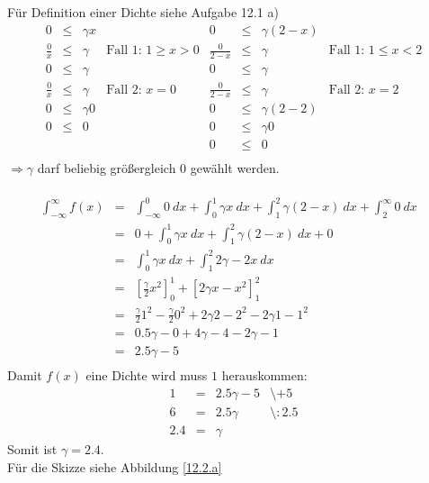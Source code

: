 \documentclass[twoside]{article}
\begin{document}
\sss
Für Definition einer Dichte siehe Aufgabe 12.1 a)
\[
    \begin{array}{rll|l||rll|l}
    0&\leq&\gamma x&&0&\leq&\gamma(2-x)&\\
    \frac{0}{x}&\leq&\gamma&\text{Fall 1: }1\geq x>0&\frac{0}{2-x}&\leq&\gamma&\text{Fall 1: }1\leq x<2\\
    0&\leq&\gamma&&0&\leq&\gamma&\\
    \frac{0}{x}&\leq&\gamma&\text{Fall 2: }x=0&\frac{0}{2-x}&\leq&\gamma&\text{Fall 2: }x=2\\
    0&\leq&\gamma 0&&0&\leq&\gamma(2-2)&\\
    0&\leq&0&&0&\leq&\gamma0&\\
    &&&&0&\leq&0&\\
    \end{array}
\]
$\Rightarrow \gamma$ darf beliebig größergleich $0$ gewählt werden.\\
\\
\[
    \begin{array}{rlll}
        \int_{-\infty}^{\infty}f(x)&=&\int_{-\infty}^{0}0~dx+\int_{0}^{1}\gamma x~dx+\int_{1}^{2}\gamma(2-x)~dx+\int_{2}^{\infty}0~dx&\\
        &=&0+\int_{0}^{1}\gamma x~dx+\int_{1}^{2}\gamma(2-x)~dx+0&\\
        &=&\int_{0}^{1}\gamma x~dx+\int_{1}^{2}2\gamma-2x~dx&\\
        &=&\left[\frac{\gamma}{2} x^2\right]_0^1+\left[2\gamma x -x^2\right]_{1}^{2}&\\
        &=&\frac{\gamma}{2}1^2-\frac{\gamma}{2}0^2+2\gamma 2 -2^2-2\gamma 1 -1^2&\\
        &=&0.5\gamma-0+4\gamma-4-2\gamma-1&\\
        &=&2.5\gamma-5&\\
    \end{array}
\]
Damit $f(x)$ eine Dichte wird muss $1$ herauskommen:
\[
    \begin{array}{rlll}
        1&=&2.5\gamma-5&\text{\textbackslash $+5$}\\
        6&=&2.5\gamma&\text{\textbackslash $:2.5$}\\
        2.4&=&\gamma&
    \end{array}
\]
Somit ist $\gamma=2.4$.\\
Für die Skizze siehe Abbildung \ref{12.2.a}
\end{document}
